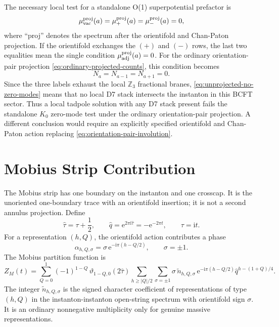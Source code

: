 \documentclass[11pt]{article}
\newcommand{\Z}{\mathbb{Z}}
\newcommand{\wt}{\widetilde}
\newcommand{\vac}{\mathrm{vac}}
\newcommand{\ii}{\mathrm{i}}
\newcommand{\e}{\mathrm{e}}
\newcommand{\vart}{\vartheta}
\newcommand{\hattau}{\widehat{\tau}}
\newcommand{\hatq}{\widehat{q}}
\begin{document}
The necessary local test for a standalone O(1) superpotential prefactor is
\begin{equation}
  \mu_{\vac}^{\rm proj}(a)=
  \mu_{+}^{\rm proj}(a)=
  \mu_{-}^{\rm proj}(a)=0,
  \label{eq:projected-zero-mode-test}
\end{equation}
where ``proj'' denotes the spectrum after the orientifold and Chan-Paton projection. If the
orientifold exchanges the $(+)$ and $(-)$ rows, the last two equalities mean the single condition
$\mu_{\rm adj}^{\rm proj}(a)=0$. For the ordinary orientation-pair projection
\eqref{eq:ordinary-projected-counts}, this condition becomes
\begin{equation}
  N_a=N_{a-1}=N_{a+1}=0.
  \label{eq:unprojected-no-zero-modes}
\end{equation}
Since the three labels exhaust the local $\Z_3$ fractional branes, \eqref{eq:unprojected-no-zero-modes}
means that no local D7 stack intersects the instanton in this BCFT sector. Thus a local tadpole
solution with any D7 stack present fails the standalone \(K_0\) zero-mode test under the
ordinary orientation-pair projection. A different conclusion would require an explicitly
specified orientifold and Chan-Paton action replacing \eqref{eq:orientation-pair-involution}.

\section{Mobius Strip Contribution}

The Mobius strip has one boundary on the instanton and one crosscap. It is the unoriented
one-boundary trace with an orientifold insertion; it is not a second annulus projection. Define
\begin{equation}
  \hattau=\tau+\frac{1}{2},
  \qquad
  \hatq=\e^{2\pi\ii\hattau}=-\e^{-2\pi t},
  \qquad
  \tau=\ii t.
\end{equation}
For a representation $(h,Q)$, the orientifold action contributes a phase
\begin{equation}
  \alpha_{h,Q,\sigma}
  =
  \sigma\,\e^{-\ii\pi(h-Q/2)},
  \qquad
  \sigma=\pm 1.
  \label{eq:orientifold-phase}
\end{equation}
The Mobius partition function is
\begin{equation}
  Z_M(t)
  =
  \sum_{Q=0}^{1}
  (-1)^{1-Q}\,
  \vart_{1-Q,0}(2\hattau)
  \sum_{h\ge |Q|/2}
  \sum_{\sigma=\pm 1}
  \sigma\,\wt n_{h,Q,\sigma}\,
  \e^{-\ii\pi(h-Q/2)}
  \hatq^{h-(1+Q)/4}.
  \label{eq:mobius-open}
\end{equation}
The integer $\wt n_{h,Q,\sigma}$ is the signed character coefficient of representations of type
$(h,Q)$ in the instanton-instanton open-string spectrum with orientifold sign $\sigma$. It is an
ordinary nonnegative multiplicity only for genuine massive representations.
\end{document}
